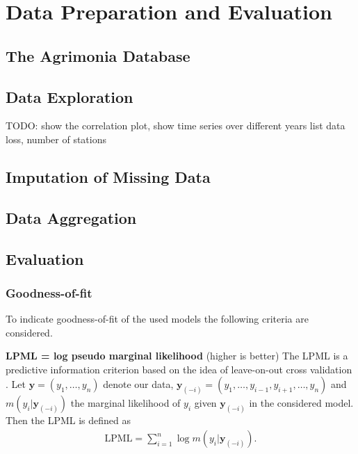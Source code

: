 \documentclass[12pt,a4paper]{article}
\begin{document}
\section{Data Preparation and Evaluation}


\subsection{The Agrimonia Database}

\subsection{Data Exploration}
TODO: show the correlation plot, show time series over different years
list data loss, number of stations

\subsection{Imputation of Missing Data}

\subsection{Data Aggregation}

\subsection{Evaluation}

\subsubsection{Goodness-of-fit}
To indicate goodness-of-fit of the used models the following criteria are considered.

\textbf{LPML = log pseudo marginal likelihood} (higher is better)
The LPML is a predictive information criterion based on the idea of leave-on-out cross validation \cite{lecturenotes}. Let $\mathbf{y} = (y_1, \dots , y_n )$ denote our data, $\mathbf{y}_{(-i)} = (y_1, \dots , y_{i-1}, y_{i+1}, \dots, y_n )$ and $m(y_i | \mathbf{y}_{(-i)}) $ the marginal likelihood of $y_i$ given $\mathbf{y}_{(-i)}$ in the considered model. Then the LPML is defined as
\begin{align*}
    \text{LPML} = \sum_{i=1}^n \log m(y_i | \mathbf{y}_{(-i)}).
\end{align*}
    
\end{document}
